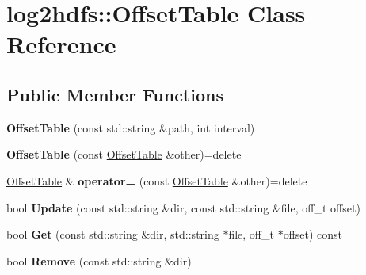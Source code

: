 \hypertarget{classlog2hdfs_1_1OffsetTable}{}\section{log2hdfs\+:\+:Offset\+Table Class Reference}
\label{classlog2hdfs_1_1OffsetTable}
\subsection*{Public Member Functions}
\begin{DoxyCompactItemize}
\item 
{\bfseries Offset\+Table} (const std\+::string \&path, int interval)\hypertarget{classlog2hdfs_1_1OffsetTable_ae1d3f7c43f3d316a5c06f1989119e0c8}{}\label{classlog2hdfs_1_1OffsetTable_ae1d3f7c43f3d316a5c06f1989119e0c8}

\item 
{\bfseries Offset\+Table} (const \hyperlink{classlog2hdfs_1_1OffsetTable}{Offset\+Table} \&other)=delete\hypertarget{classlog2hdfs_1_1OffsetTable_aff9a29ac0155586cfee07055ef49d39b}{}\label{classlog2hdfs_1_1OffsetTable_aff9a29ac0155586cfee07055ef49d39b}

\item 
\hyperlink{classlog2hdfs_1_1OffsetTable}{Offset\+Table} \& {\bfseries operator=} (const \hyperlink{classlog2hdfs_1_1OffsetTable}{Offset\+Table} \&other)=delete\hypertarget{classlog2hdfs_1_1OffsetTable_a534696479a6f451de849258df171dc98}{}\label{classlog2hdfs_1_1OffsetTable_a534696479a6f451de849258df171dc98}

\item 
bool {\bfseries Update} (const std\+::string \&dir, const std\+::string \&file, off\+\_\+t offset)\hypertarget{classlog2hdfs_1_1OffsetTable_a260976a3df8e60000906e48b3f4d0995}{}\label{classlog2hdfs_1_1OffsetTable_a260976a3df8e60000906e48b3f4d0995}

\item 
bool {\bfseries Get} (const std\+::string \&dir, std\+::string $\ast$file, off\+\_\+t $\ast$offset) const \hypertarget{classlog2hdfs_1_1OffsetTable_ab19810f01c3594c9b0094a0d801eab37}{}\label{classlog2hdfs_1_1OffsetTable_ab19810f01c3594c9b0094a0d801eab37}

\item 
bool {\bfseries Remove} (const std\+::string \&dir)\hypertarget{classlog2hdfs_1_1OffsetTable_aff2ab2bdc869af0ebcba3932011fa48b}{}\label{classlog2hdfs_1_1OffsetTable_aff2ab2bdc869af0ebcba3932011fa48b}


\end{DoxyCompactItemize}
